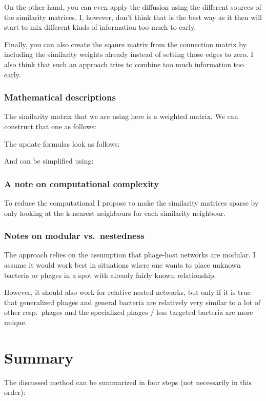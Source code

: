\documentclass{article}
\begin{document}
On the other hand, you can even apply the diffusion
using the different sources of the similarity matrices. I, however, don't
think that is the best way as it then will start to mix different kinds 
of information too much to early.

Finally, you can
also create the sqaure matrix from the connection matrix by including the
similarity weights already instead of setting those edges to zero. I also 
think that such an approach tries to combine too much information too early.

\subsubsection{Mathematical descriptions}

The similarity matrix that we are using here is a weighted matrix. We can construct
that one as follows:

The update formulas look as follows:

And can be simplified using:

\subsubsection{A note on computational complexity}

To reduce the computational I propose to make the similarity matrices sparse by only
looking at the k-nearest neighbours for each similarity neighbour.

\subsubsection{Notes on modular vs.\ nestedness}

The approach relies on the assumption that phage-host networks are
modular. I assume it would work best in situations where one wants to place
unknown bacteria or phages in a spot with already fairly known relationship. 

However, it should also work for relative nested networks, but only if it is 
true that generalized phages and general bacteria are relatively very 
similar to a lot of other resp.\ phages and 
the specialized phages / less targeted bacteria are more unique. 

\section{Summary}

The discussed method can be summarized in four steps (not necessarily in this order):
\end{document}
